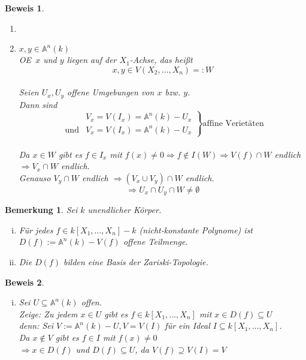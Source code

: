 \documentclass[a4paper,12pt]{report}
\theoremstyle{break}
\newtheorem{Bem}[Def]{Bemerkung}
\theoremstyle{nonumberbreak}
\newtheorem{Bew}{Beweis}
\theoremstyle{nonumberplain}
\newcommand{\A}{\mathbb{A}}
\renewcommand{\OE}{O\!\!E~}
\begin{document}
\begin{Bew}\begin{enumerate}[$n=1$:]
\item[$n=1$:] \checkmark
\item[{$n\ge 2$}:] $x,y \in \A ^n(k)$\\
	\OE $x$ und $y$ liegen auf der $X_1$-Achse, das hei\ss t \[x,y \in V(X_2,\dots ,X_n) =:W\]\\
	Seien $U_x,U_y$ offene Umgebungen von $x$ bzw. $y$.\\
	Dann sind\[\left.
		\begin{array}{rl}
		 & V_x=V(I_x) = \A ^n(k)-U_x\\
		 \textrm{und} & V_x=V(I_x) = \A ^n(k)-U_x
		\end{array}	\right\} \textrm{affine Veriet\"aten}\]\\
	Da $x\in W$ gibt es $f\in I_x$ mit $f(x) \neq 0 \Rightarrow f \notin I(W) \Rightarrow V(f)\cap W$ endlich $	\Rightarrow V_x \cap W$ endlich.\\
	Genauso $V_y \cap W$ endlich
	$\Rightarrow (V_x \cup V_y)\cap W$ endlich.
	\[\Rightarrow U_x \cap U_y \cap W \not= \emptyset\]
\end{enumerate}\end{Bew}

\begin{Bem}\label{bem3.6}
Sei $k$ unendlicher K\"orper. \begin{enumerate}[i)]
\item
	F\"ur jedes $f \in k[X_1,\dots ,X_n]-k$ (nicht-konstante Polynome) ist $D(f):= \A ^n(k)-V(f)$ offene Teilmenge.
\item\label{bem3.6ii}
	Die $D(f)$ bilden eine Basis der Zariski-Topologie.
\end{enumerate}\end{Bem}

\begin{Bew}\begin{enumerate}[i)]
\item[ii)]
Sei $U \subseteq \A ^n(k)$ offen.\\
\emph{Zeige}: Zu jedem $x\in U$ gibt es $f\in k[X_1,\dots ,X_n]$ mit $x\in D(f) \subseteq U$\\
\emph{denn:} Sei $V:=\A ^n(k)-U, V=V(I)$ f\"ur ein Ideal $I \subseteq k[X_1,\dots ,X_n]$.\\
Da $x\notin V$ gibt es $f\in I$ mit $f(x) \not= 0$\\
$\Rightarrow x\in D(f)$ und $D(f) \subseteq U$, da $V(f) \supseteq V(I) =V$
\end{enumerate}\end{Bew}
\end{document}
